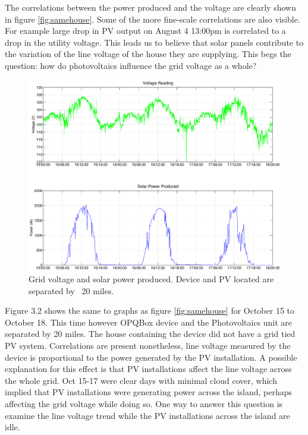 The correlations between the power produced and the voltage are clearly shown in figure  \ref{fig:samehouse}. Some of the more fine-scale correlations are also visible. 
For example large drop in PV output on August 4 13:00pm is correlated to a drop in the utility voltage. This leads us to believe that solar panels contribute to the
variation of the line voltage of the house they are supplying. This begs the question: how do photovoltaics influence the grid voltage as a whole?

\begin{figure}[h!]
\centering
\includegraphics[width=\textwidth]{img/SunnyWeather.eps}
\caption{Grid voltage and solar power produced. Device and PV located are separated by ~20 miles.}
\label{fig:diffhouse}
\end{figure} 

Figure 3.2 shows the same to graphs as figure \ref{fig:samehouse} for October 15 to October 18. This time however OPQBox device and the Photovoltaics unit are separated by 20 miles. The house
containing the device did not have a grid tied PV system. Correlations are present nonetheless, line voltage measured by the device is proportional to the power generated by the PV installation.
A possible explanation for this effect is that PV installations affect the line voltage across the whole grid. Oct 15-17 were clear days with minimal cloud cover, which implied that PV
installations were generating power across the island, perhaps affecting the grid voltage while doing so. One way to answer this question is examine the line voltage trend while the PV installations
across the island are idle. 

